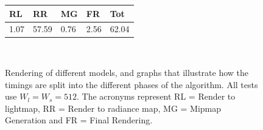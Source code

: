 \begin{figure}
{\begin{tabular}[b]{lllll}
\multicolumn{1}{|l|}{RL}   & \multicolumn{1}{l|}{RR}    & \multicolumn{1}{l|}{MG}   & \multicolumn{1}{l|}{FR}   & \multicolumn{1}{l|}{Tot}   \\ \hline
\multicolumn{1}{|l|}{1.07} & \multicolumn{1}{l|}{57.59} & \multicolumn{1}{l|}{0.76} & \multicolumn{1}{l|}{2.56} & \multicolumn{1}{l|}{62.04} \\ \hline
\end{tabular}
}\\
\caption{Rendering of different models, and graphs that illustrate how the timings are split into the different phases of the algorithm. All tests use $W_l = W_s = 512$. The acronyms represent RL = Render to lightmap, RR = Render to radiance map, MG = Mipmap Generation and FR = Final Rendering.}
\label{fig:timingssplit}
\end{figure}

\FloatBarrier
